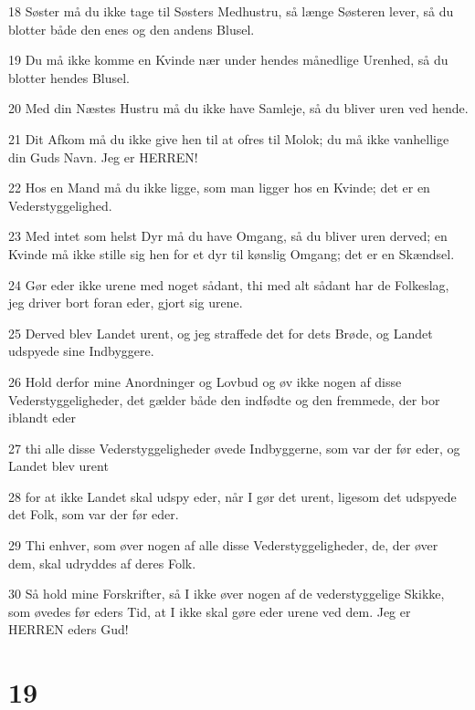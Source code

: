 \par 18 Søster må du ikke tage til Søsters Medhustru, så længe Søsteren lever, så du blotter både den enes og den andens Blusel.
\par 19 Du må ikke komme en Kvinde nær under hendes månedlige Urenhed, så du blotter hendes Blusel.
\par 20 Med din Næstes Hustru må du ikke have Samleje, så du bliver uren ved hende.
\par 21 Dit Afkom må du ikke give hen til at ofres til Molok; du må ikke vanhellige din Guds Navn. Jeg er HERREN!
\par 22 Hos en Mand må du ikke ligge, som man ligger hos en Kvinde; det er en Vederstyggelighed.
\par 23 Med intet som helst Dyr må du have Omgang, så du bliver uren derved; en Kvinde må ikke stille sig hen for et dyr til kønslig Omgang; det er en Skændsel.
\par 24 Gør eder ikke urene med noget sådant, thi med alt sådant har de Folkeslag, jeg driver bort foran eder, gjort sig urene.
\par 25 Derved blev Landet urent, og jeg straffede det for dets Brøde, og Landet udspyede sine Indbyggere.
\par 26 Hold derfor mine Anordninger og Lovbud og øv ikke nogen af disse Vederstyggeligheder, det gælder både den indfødte og den fremmede, der bor iblandt eder
\par 27 thi alle disse Vederstyggeligheder øvede Indbyggerne, som var der før eder, og Landet blev urent
\par 28 for at ikke Landet skal udspy eder, når I gør det urent, ligesom det udspyede det Folk, som var der før eder.
\par 29 Thi enhver, som øver nogen af alle disse Vederstyggeligheder, de, der øver dem, skal udryddes af deres Folk.
\par 30 Så hold mine Forskrifter, så I ikke øver nogen af de vederstyggelige Skikke, som øvedes før eders Tid, at I ikke skal gøre eder urene ved dem. Jeg er HERREN eders Gud!

\chapter{19}


